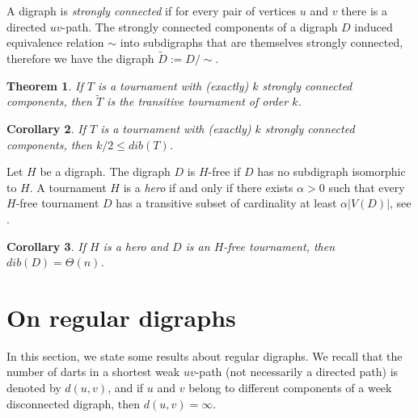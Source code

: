 \documentclass[12pt]{article}
\newtheorem{theorem}{Theorem}
\newtheorem{corollary}[theorem]{Corollary}
\begin{document}

A digraph is \textit{strongly connected} if for every pair of vertices $u$ and $v$ there is a directed $uv$-path. The strongly connected components of a digraph $D$ induced equivalence relation $\sim$ into subdigraphs that are themselves strongly connected, therefore we have the digraph $\tilde{D}:= D/\sim$.

\begin{theorem}\cite{MR2107429}
    If $T$ is a tournament with (exactly) $k$ strongly connected components, then $\tilde{T}$ is the transitive tournament of order $k$.
\end{theorem}

\begin{corollary}
    If $T$ is a tournament with (exactly) $k$ strongly connected components, then $k/2\leq dib(T)$.
\end{corollary}

Let $H$ be a digraph. The digraph $D$ is $H$-free if $D$ has no subdigraph isomorphic to $H$. A tournament $H$ is a \textit{hero} if and only if there exists $\alpha>0$ such that every $H$-free tournament $D$ has a transitive subset of cardinality at least $\alpha |V (D)|$, see \cite{MR2995716}.

\begin{corollary}
If $H$ is a hero and $D$ is an $H$-free tournament, then $dib(D)=\Theta(n)$.
\end{corollary}


\section{On regular digraphs}

In this section, we state some results about regular digraphs. We recall that the number of darts in a shortest weak $uv$-path (not necessarily a directed path) is denoted by $d(u,v)$, and if $u$ and $v$ belong to different components of a week disconnected digraph, then $d(u,v)= \infty$.
\end{document}
